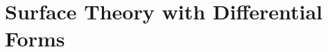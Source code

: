 \documentclass[Shifrin_Solutions_Spring_2018]{subfiles}
\begin{document}
\section{Surface Theory with Differential Forms}

\begin{exercise}

\end{exercise}

\begin{exercise}

\end{exercise}

\begin{exercise}

\end{exercise}


\begin{exercise}

\end{exercise}


\begin{exercise}

\end{exercise}


\begin{exercise}

\end{exercise}


\begin{exercise}

\end{exercise}


\begin{exercise}

\end{exercise}


\begin{exercise}

\end{exercise}


\begin{exercise}

\end{exercise}


\begin{exercise}

\end{exercise}


\begin{exercise}

\end{exercise}


\begin{exercise}

\end{exercise}
\end{document}
